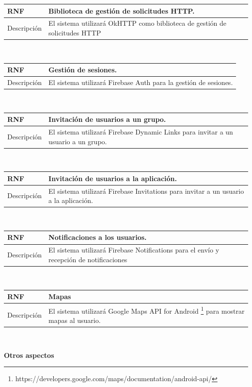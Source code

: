 \documentclass[twoside]{report}
\newcommand\addrow[2]{#1 &#2\\ }
\newcommand\addheading[2]{#1 &#2\\ \hline}
\newcommand\tabularhead{\begin{tabular}{lp{0.7\textwidth}}
\hline
}
\newenvironment{req}{\tabularhead}
{\hline\end{tabular}}
\begin{document}
\begin{req}
	\addheading{\textbf{RNF\arabic{nonFunctionalRequirements}}}{Biblioteca de gestión de solicitudes HTTP.}
	\addrow{Descripción}{El sistema utilizará OkHTTP como biblioteca de gestión de solicitudes HTTP}
\end{req}\\

\begin{req}
	\addheading{\textbf{RNF\arabic{nonFunctionalRequirements}}}{Gestión de sesiones.}
	\addrow{Descripción}{El sistema utilizará Firebase Auth para la gestión de sesiones.}
\end{req}\\
	
\begin{req}
	\addheading{\textbf{RNF\arabic{nonFunctionalRequirements}}}{Invitación de usuarios a un grupo.}
	\addrow{Descripción}{El sistema utilizará Firebase Dynamic Links para invitar a un usuario a un grupo.}
\end{req}\\

\begin{req}
	\addheading{\textbf{RNF\arabic{nonFunctionalRequirements}}}{Invitación de usuarios a la aplicación.}
	\addrow{Descripción}{El sistema utilizará Firebase Invitations para invitar a un usuario a la aplicación.}
\end{req}\\

\begin{req}
	\addheading{\textbf{RNF\arabic{nonFunctionalRequirements}}}{Notificaciones a los usuarios.}
	\addrow{Descripción}{El sistema utilizará Firebase Notifications para el envío y recepción de notificaciones}
\end{req}\\

\begin{req}
	\addheading{\textbf{RNF\arabic{nonFunctionalRequirements}}}{Mapas}
	\addrow{Descripción}{El sistema utilizará Google Maps API for Android \footnote{https://developers.google.com/maps/documentation/android-api/} para mostrar mapas al usuario.}
\end{req}\\

\textbf{Otros aspectos}\\
\end{document}
